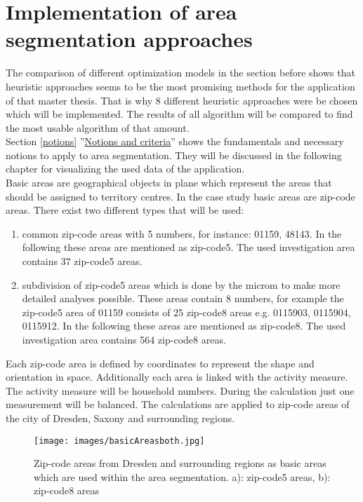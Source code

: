 \section{Implementation of area segmentation approaches}\label{Implementation}
The comparison of different optimization models in the section before shows that heuristic approaches seems to be the most promising methods for the application of that master thesis. That is why 8 different heuristic approaches were be chosen which will be implemented. The results of all algorithm will be compared to find the most usable algorithm of that amount.  \\
Section \ref{notions} ''\hyperref[notions]{Notions and criteria}'' shows the fundamentals and necessary notions to apply to area segmentation. They will be discussed in the following chapter for  visualizing the used data of the application. \\
Basic areas are geographical objects in plane which represent the areas that should be assigned to territory centres. In the case study basic areas are zip-code areas. There exist two different types that will be used:
\begin{enumerate}
	\item common zip-code areas with 5 numbers, for instance: 01159, 48143. In the following these areas are mentioned as zip-code5. The used investigation area contains 37 zip-code5 areas.
	\item subdivision of zip-code5 areas which is done by the microm to make more detailed analyses possible. These areas contain 8 numbers, for example the zip-code5 area of 01159 consists of 25 zip-code8 areas e.g. 0115903, 0115904, 0115912. In the following these areas are mentioned as zip-code8. The used investigation area contains 564 zip-code8 areas.
\end{enumerate}

Each zip-code area is defined by coordinates to represent the shape and orientation in space. Additionally each area is linked with the activity measure. The activity measure will be household numbers. During the calculation just one measurement will be balanced. The calculations are applied to zip-code areas of the city of Dresden, Saxony and surrounding regions.

\begin{figure}[H]
	\centering
	\texttt{[image: images/basicAreasboth.jpg]}
	\caption[Zip-code areas from Dresden and surrounding regions as basic areas which are used within the area segmentation.]{Zip-code areas from Dresden and surrounding regions as basic areas which are used within the area segmentation. a): zip-code5 areas, b): zip-code8 areas}
\end{figure} 


